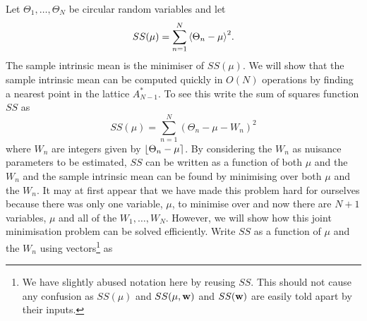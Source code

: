 \documentclass[journal]{../bib/IEEEtran}
\begin{document}
Let $\Theta_1,\dots,\Theta_N$ be circular random variables and let
\[
SS(\mu) = \sum_{n=1}^{N}{ \left< \Theta_n - \mu \right>^2 }.
\]
The sample intrinsic mean is the minimiser of $SS(\mu)$. 
We will show that the sample intrinsic mean can be computed quickly in $O(N)$ operations by finding a nearest point in the lattice $A_{N-1}^*$.  To see this write the sum of squares function $SS$ as
\[
SS(\mu) = \sum_{n=1}^{N}{ \left( \Theta_n - \mu - W_n \right)^2 }
\]
where $W_n$ are integers given by ${\left\lfloor \Theta_n - \mu \right\rceil}$. 
By considering the $W_n$ as nuisance parameters to be estimated, $SS$ can be written as a function of both $\mu$ and the $W_n$ and the sample intrinsic mean can be found by minimising over both $\mu$ and the $W_n$. It may at first appear that we have made this problem hard for ourselves because there was only one variable, $\mu$, to minimise over and now there are $N+1$ variables, $\mu$ and all of the $W_1, \dots, W_N$.  However, we will show how this joint minimisation problem can be solved efficiently.  Write $SS$ as a function of $\mu$ and the $W_n$ using vectors\footnote{We have slightly abused notation here by reusing $SS$. This should not cause any confusion as $SS(\mu)$ and $SS(\mu,\mathbf{w})$ and $SS(\mathbf{w})$ are easily told apart by their inputs.} as
\end{document}
